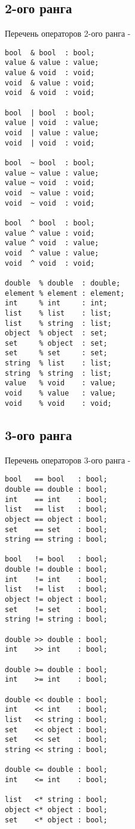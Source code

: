 \documentclass[a4paper, 14pt]{extarticle}
\begin{document}
\subsection{2-ого ранга}

\noindent Перечень операторов 2-ого ранга -
\begin{lstlisting}[numbers=none]
bool  & bool  : bool;
value & value : value;
value & void  : void;
void  & value : void;
void  & void  : void;

bool  | bool  : bool;
value | void  : value;
void  | value : value;
void  | void  : void;

bool  ~ bool  : bool;
value ~ value : value;
value ~ void  : void;
void  ~ value : void;
void  ~ void  : void;

bool  ^ bool  : bool;
value ^ value : void;
value ^ void  : value;
void  ^ value : value;
void  ^ void  : void;

double  % double  : double;
element % element : element;
int     % int     : int;
list    % list    : list;
list    % string  : list;
object  % object  : set;
set     % object  : set;
set     % set     : set;
string  % list    : list;
string  % string  : list;
value   % void    : value;
void    % value   : value;
void    % void    : void;
\end{lstlisting}

\subsection{3-ого ранга}

\noindent Перечень операторов 3-ого ранга -
\begin{lstlisting}[numbers=none]
bool   == bool   : bool;
double == double : bool;
int    == int    : bool;
list   == list   : bool;
object == object : bool;
set    == set    : bool;
string == string : bool;

bool   != bool   : bool;
double != double : bool;
int    != int    : bool;
list   != list   : bool;
object != object : bool;
set    != set    : bool;
string != string : bool;

double >> double : bool;
int    >> int    : bool;

double >= double : bool;
int    >= int    : bool;

double << double : bool;
int    << int    : bool;
list   << string : bool;
set    << object : bool;
set    << set    : bool;
string << string : bool;

double <= double : bool;
int    <= int    : bool;

list   <* string : bool;
object <* object : bool;
set    <* object : bool;
\end{lstlisting}
\end{document}
